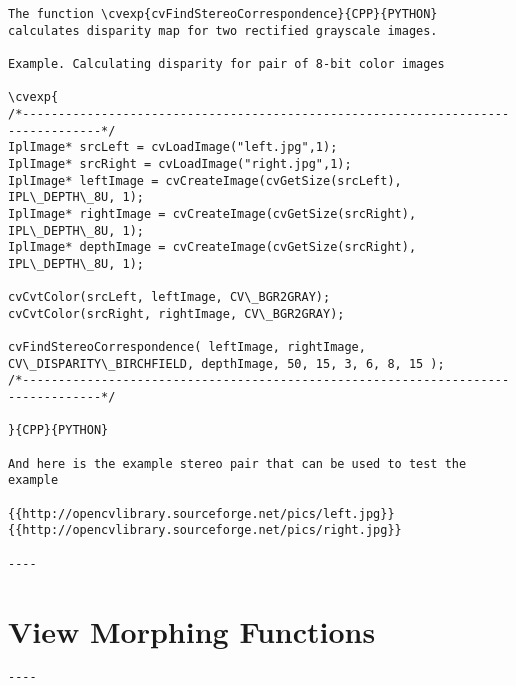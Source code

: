 \begin{verbatim}
The function \cvexp{cvFindStereoCorrespondence}{CPP}{PYTHON} calculates disparity map for two rectified grayscale images.

Example. Calculating disparity for pair of 8-bit color images

\cvexp{
/*---------------------------------------------------------------------------------*/
IplImage* srcLeft = cvLoadImage("left.jpg",1);
IplImage* srcRight = cvLoadImage("right.jpg",1);
IplImage* leftImage = cvCreateImage(cvGetSize(srcLeft), IPL\_DEPTH\_8U, 1);
IplImage* rightImage = cvCreateImage(cvGetSize(srcRight), IPL\_DEPTH\_8U, 1);
IplImage* depthImage = cvCreateImage(cvGetSize(srcRight), IPL\_DEPTH\_8U, 1);

cvCvtColor(srcLeft, leftImage, CV\_BGR2GRAY);
cvCvtColor(srcRight, rightImage, CV\_BGR2GRAY);

cvFindStereoCorrespondence( leftImage, rightImage, CV\_DISPARITY\_BIRCHFIELD, depthImage, 50, 15, 3, 6, 8, 15 );
/*---------------------------------------------------------------------------------*/

}{CPP}{PYTHON}

And here is the example stereo pair that can be used to test the example

{{http://opencvlibrary.sourceforge.net/pics/left.jpg}} {{http://opencvlibrary.sourceforge.net/pics/right.jpg}}

----
\end{verbatim}
\section{View Morphing Functions}
\begin{verbatim}
----
\end{verbatim}
